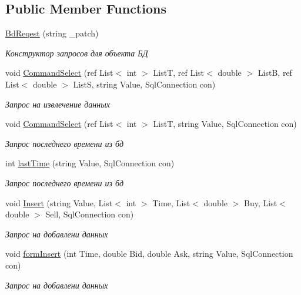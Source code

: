 \subsection*{Public Member Functions}
\begin{DoxyCompactItemize}
\item 
\hyperlink{class_client_1_1_bd_reqest_a782e678c91671039896a90ac999b8966}{Bd\+Reqest} (string \+\_\+patch)
\begin{DoxyCompactList}\small\item\em Конструктор запросов для объекта БД \end{DoxyCompactList}\item 
void \hyperlink{class_client_1_1_bd_reqest_ab782415f646f42b5c4e64b74d68d0bcf}{Command\+Select} (ref List$<$ int $>$ ListT, ref List$<$ double $>$ ListB, ref List$<$ double $>$ ListS, string Value, Sql\+Connection con)
\begin{DoxyCompactList}\small\item\em Запрос на извлечение данных \end{DoxyCompactList}\item 
void \hyperlink{class_client_1_1_bd_reqest_ad9b512bdcefe04563e937ab9edb0864d}{Command\+Select} (ref List$<$ int $>$ ListT, string Value, Sql\+Connection con)
\begin{DoxyCompactList}\small\item\em Запрос последнего времени из бд \end{DoxyCompactList}\item 
int \hyperlink{class_client_1_1_bd_reqest_ac978622ddc77c5198af52e5fccefdcc2}{last\+Time} (string Value, Sql\+Connection con)
\begin{DoxyCompactList}\small\item\em Запрос последнего времени из бд \end{DoxyCompactList}\item 
void \hyperlink{class_client_1_1_bd_reqest_ae9e0d4839d82d8e9573d867d9dfd8755}{Insert} (string Value, List$<$ int $>$ Time, List$<$ double $>$ Buy, List$<$ double $>$ Sell, Sql\+Connection con)
\begin{DoxyCompactList}\small\item\em Запрос на добавлени данных \end{DoxyCompactList}\item 
void \hyperlink{class_client_1_1_bd_reqest_aa429c52005707d06a7df660f3dc6eb62}{form\+Insert} (int Time, double Bid, double Ask, string Value, Sql\+Connection con)
\begin{DoxyCompactList}\small\item\em Запрос на добавлени данных \end{DoxyCompactList}\end{DoxyCompactItemize}
